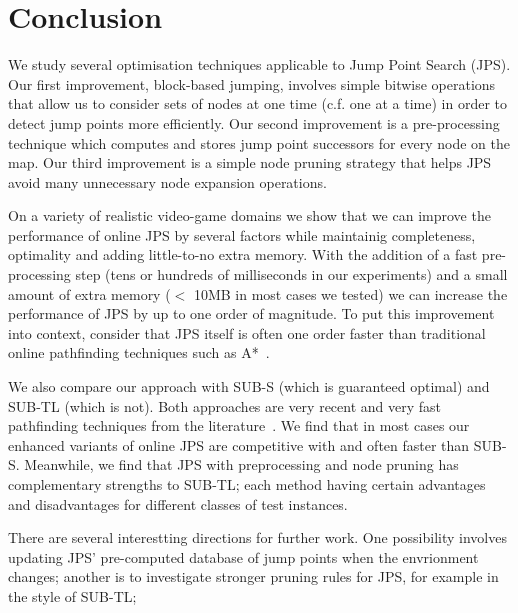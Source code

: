 \section{Conclusion}
\label{sec::conclusion}
We study several optimisation techniques applicable to Jump Point Search (JPS).
Our first improvement, block-based jumping, involves simple bitwise
operations that allow us to consider sets of nodes at one time (c.f. one
at a time) in order to detect jump points more efficiently. Our second
improvement is a pre-processing technique which computes and stores jump point
successors for every node on the map. Our third improvement is a simple node
pruning strategy that helps JPS avoid many unnecessary node expansion operations.

On a variety of realistic video-game domains we show that we can improve the
performance of online JPS by several factors while maintainig completeness,
optimality and adding little-to-no extra memory. With the addition of a fast
pre-processing step (tens or hundreds of milliseconds in our experiments) and
a small amount of extra memory ($<$ 10MB in most cases we tested) we can
increase the performance of JPS by up to one order of magnitude.  To put this
improvement into context, consider that JPS itself is often one order faster
than traditional online pathfinding techniques such as A{*}~\cite{harabor11b}.

We also compare our approach with SUB-S (which is guaranteed optimal) and SUB-TL 
(which is not). Both approaches are very recent and very fast pathfinding techniques from the 
literature~\cite{urasKH13}. We find that in most cases our enhanced variants of online 
JPS are competitive with and often faster than SUB-S. Meanwhile, we find that JPS with
preprocessing and node pruning has complementary strengths to SUB-TL; each method having
certain advantages and disadvantages for different classes of test instances.

There are several interestting directions for further work. One possibility involves
updating JPS' pre-computed database of jump points when the envrionment changes; another 
is to investigate stronger pruning rules for JPS, for example in the style of SUB-TL;
